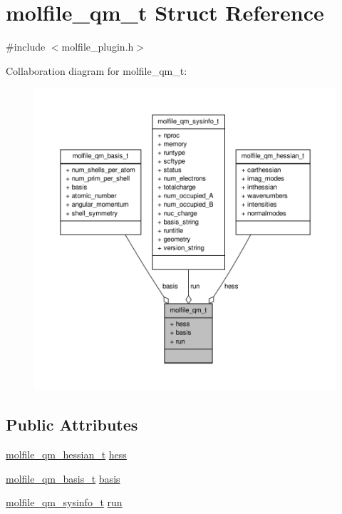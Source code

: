 \hypertarget{structmolfile__qm__t}{\section{molfile\-\_\-qm\-\_\-t \-Struct \-Reference}
\label{structmolfile__qm__t}
}


{\ttfamily \#include $<$molfile\-\_\-plugin.\-h$>$}



\-Collaboration diagram for molfile\-\_\-qm\-\_\-t\-:
\nopagebreak
\begin{figure}[H]
\begin{center}
\leavevmode
\includegraphics[width=350pt]{structmolfile__qm__t__coll__graph}
\end{center}
\end{figure}
\subsection*{\-Public \-Attributes}
\begin{DoxyCompactItemize}
\item 
\hyperlink{structmolfile__qm__hessian__t}{molfile\-\_\-qm\-\_\-hessian\-\_\-t} \hyperlink{structmolfile__qm__t_ac582b339912010afeeb396dc21d27f1b}{hess}
\item 
\hyperlink{structmolfile__qm__basis__t}{molfile\-\_\-qm\-\_\-basis\-\_\-t} \hyperlink{structmolfile__qm__t_a90ba6314a65ca045e7932f00e51cd4e3}{basis}
\item 
\hyperlink{structmolfile__qm__sysinfo__t}{molfile\-\_\-qm\-\_\-sysinfo\-\_\-t} \hyperlink{structmolfile__qm__t_a732532e2eb6d9ce2fa960902ac4dfdea}{run}
\end{DoxyCompactItemize}


